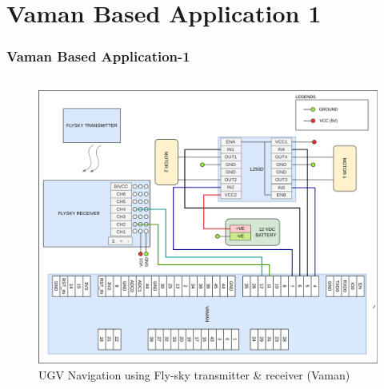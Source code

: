 \documentclass[xcolor=table]{beamer}
\begin{document}
\section{Vaman Based Application 1}
\begin{frame}
\frametitle{Vaman Based Application-1}
\begin{columns}
	\begin{figure}[h!]
  		\centering
  		\includegraphics[width=\linewidth]{./figs/Wiring_UGV_flysky_Vaman.png}
  		\caption{UGV Navigation using Fly-sky transmitter \& receiver (Vaman)}
  		\label{Wiring_UGV_flysky_Vaman}
	\end{figure}
\end{columns}
\end{frame}
\end{document}
